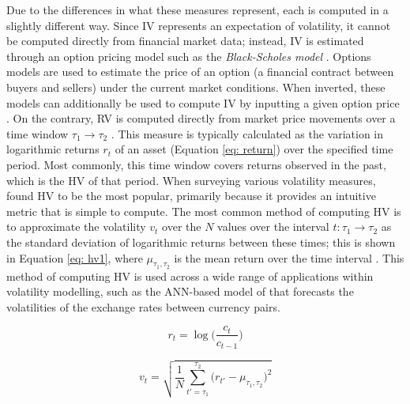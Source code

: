 \documentclass[a4paper, 11pt]{report}
\begin{document}
    Due to the differences in what these measures represent, each is computed in a slightly different way. Since IV represents an expectation of volatility, it cannot be computed directly from financial market data; instead, IV is estimated through an option pricing model such as the \emph{Black-Scholes model} \citep{black-1973}. Options models are used to estimate the price of an option (a financial contract between buyers and sellers) under the current market conditions. When inverted, these models can additionally be used to compute IV by inputting a given option price \citep{tino-2001}. On the contrary, RV is computed directly from market price movements over a time window $\tau_1 \to \tau_2$ \citep{ge-2022}. This measure is typically calculated as the variation in logarithmic returns $r_t$ of an asset (Equation \ref{eq: return}) over the specified time period. Most commonly, this time window covers returns observed in the past, which is the HV of that period. When surveying various volatility measures, \citet{ge-2022} found HV to be the most popular, primarily because it provides an intuitive metric that is simple to compute. The most common method of computing HV is to approximate the volatility $v_t$ over the $N$ values over the interval $t \colon \tau_1 \to \tau_2$ as the standard deviation of logarithmic returns between these times; this is shown in Equation \ref{eq: hv1}, where $\mu_{\tau_1, \tau_2}$ is the mean return over the time interval \citep{ge-2022}. This method of computing HV is used across a wide range of applications within volatility modelling, such as the ANN-based model of \citet{lahmiri-2017} that forecasts the volatilities of the exchange rates between currency pairs.

    \begin{equation}
        \label{eq: return}
        r_t = \log\Big(\frac{c_t}{c_{t-1}}\Big)
    \end{equation}

    \begin{equation}
        \label{eq: hv1}
        v_t = \sqrt{ \frac{1}{N} \sum_{t' = \tau_1}^{\tau_2} \big( r_{t'} - \mu_{\tau_1, \tau_2} \big)^2 }
    \end{equation}
\end{document}
